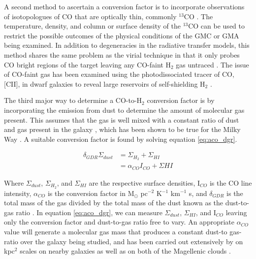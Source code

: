 A second method to ascertain a conversion factor is to incorporate observations of isotopologues of CO that are optically thin, commonly $^{13}$CO \citep{bolatto2013}.   The temperature, density, and column or surface density of the $^{13}$CO can be used to restrict the possible outcomes of the physical conditions of the GMC or GMA being examined.  In addition to degeneracies in the radiative transfer models, this method shares the same problem as the virial technique in that it only probes CO bright regions of the target leaving any CO-faint H$_2$ gas untraced \citep{bolatto2013}.  The issue of CO-faint gas has been examined using the photodissociated tracer of CO, [CII], in dwarf galaxies to reveal large reservoirs of self-shielding H$_2$ \citep{madden1997}.

The third major way to determine a CO-to-H$_2$ conversion factor is by incorporating the emission from dust to determine the amount of molecular gas present.  This assumes that the gas is well mixed with a constant ratio of dust and gas present in the galaxy \citep{leroy2011}, which has been shown to be true for the Milky Way \citep{boulanger1996}.  A suitable conversion factor is found by solving equation \ref{eq:aco_dgr}.

\begin{equation}\label{eq:aco_dgr}
  \begin{split}
    \delta_{GDR}\Sigma_{dust} & = \Sigma_{H_2} + \Sigma_{HI} \\
    						  & = \alpha_{CO} I_{CO} + \Sigma{HI}
  \end{split}
\end{equation}

Where $\Sigma_{dust}$, $\Sigma_{H_2}$, and $\Sigma_{HI}$ are the respective surface densities, I$_{CO}$ is the CO line intensity, $\alpha_{CO}$ is the conversion factor in M$_\odot$ pc$^{-2}$ K$^{-1}$ km$^{-1}$ s, and $\delta_{GDR}$ is the total mass of the gas divided by the total mass of the dust known as the dust-to-gas ratio \citep{leroy2011,sandstrom2013}.  In equation \ref{eq:aco_dgr}, we can measure $\Sigma_{dust}$, $\Sigma_{HI}$, and I$_{CO}$ leaving only the conversion factor and dust-to-gas ratio free to vary.  An appropriate $\alpha_{CO}$ value will generate a molecular gas mass that produces a constant dust-to gas-ratio over the galaxy being studied, and has been carried out extensively by \cite{sandstrom2013} on kpc$^2$ scales on nearby galaxies as well as on both of the Magellenic clouds \citep{leroy2011}.

